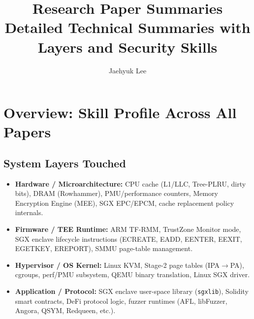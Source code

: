\documentclass[11pt,letterpaper]{article}
\title{\textbf{Research Paper Summaries}\\
\large Detailed Technical Summaries with Layers and Security Skills}
\author{Jaehyuk Lee}
\date{}
\begin{document}
\maketitle
\tableofcontents
\newpage

\section*{Overview: Skill Profile Across All Papers}

\subsection*{System Layers Touched}
\begin{itemize}
    \item \textbf{Hardware / Microarchitecture:} CPU cache (L1/LLC, Tree-PLRU, dirty bits), DRAM (Rowhammer), PMU/performance counters, Memory Encryption Engine (MEE), SGX EPC/EPCM, cache replacement policy internals.
    \item \textbf{Firmware / TEE Runtime:} ARM TF-RMM, TrustZone Monitor mode, SGX enclave lifecycle instructions (ECREATE, EADD, EENTER, EEXIT, EGETKEY, EREPORT), SMMU page-table management.
    \item \textbf{Hypervisor / OS Kernel:} Linux KVM, Stage-2 page tables (IPA$\to$PA), cgroups, perf/PMU subsystem, QEMU binary translation, Linux SGX driver.
    \item \textbf{Application / Protocol:} SGX enclave user-space library (\texttt{sgxlib}), Solidity smart contracts, DeFi protocol logic, fuzzer runtimes (AFL, libFuzzer, Angora, QSYM, Redqueen, etc.).
\end{itemize}
\end{document}
